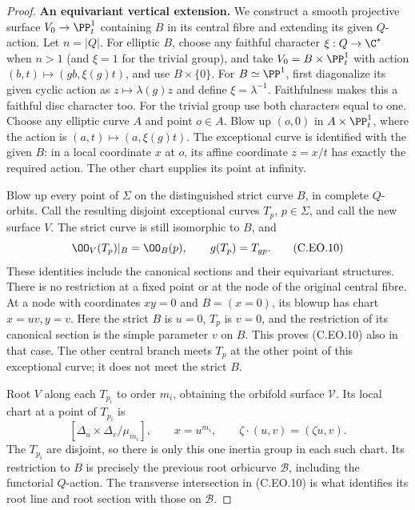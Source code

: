 \begin{proof}
\par\medskip\noindent\textbf{An equivariant vertical extension.}
We construct a smooth projective surface
$V_0\to\PP^1_t$ containing $B$ in its
central fibre and extending its given
$Q$-action. Let $n=|Q|$.
For elliptic $B$, choose any faithful
character $\xi:Q\to\C^*$ when $n>1$
(and $\xi=1$ for the trivial group),
and take $V_0=B\times\PP^1_t$
with action $(b,t)\mapsto(gb,\xi(g)t)$,
and use $B\times\{0\}$.
For $B\simeq\PP^1$, first diagonalize
its given cyclic action as
$z\mapsto\lambda(g)z$ and define
$\xi=\lambda^{-1}$. Faithfulness makes
this a faithful disc character too.
For the trivial group use both
characters equal to one. Choose any
elliptic curve $A$ and point $o\in A$.
Blow up $(o,0)$ in $A\times\PP^1_t$,
where the action is
$(a,t)\mapsto(a,\xi(g)t)$.
The exceptional curve is identified with
the given $B$: in a local coordinate $x$
at $o$, its affine coordinate $z=x/t$
has exactly the required action. The
other chart supplies its point at infinity.

Blow up every point of $\Sigma$ on the
distinguished strict curve $B$, in complete
$Q$-orbits. Call the resulting disjoint
exceptional curves $T_p$, $p\in\Sigma$,
and call the new surface $V$. The strict
curve is still isomorphic to $B$, and
\[
 \OO_V(T_p)|_B=\OO_B(p),\qquad
                     g(T_p)=T_{gp}.                \tag{C.EO.10}
\]
These identities include the canonical
sections and their equivariant structures.
There is no restriction at a fixed point
or at the node of the original central
fibre. At a node with coordinates $xy=0$
and $B=(x=0)$, its blowup has chart
$x=uv,y=v$. Here the strict $B$ is
$u=0$, $T_p$ is $v=0$, and the
restriction of its canonical section
is the simple parameter $v$ on $B$.
This proves (C.EO.10) also in that case.
The other central branch meets $T_p$
at the other point of this exceptional
curve; it does not meet the strict $B$.

Root $V$ along each $T_{p_i}$ to order
$m_i$, obtaining the orbifold surface
$\mathcal V$. Its local chart at a
point of $T_{p_i}$ is
\[
 [\Delta_u\times\Delta_v/\mu_{m_i}],
           \qquad x=u^{m_i},\qquad
           \zeta\cdot(u,v)=(\zeta u,v).
                                                               \tag{C.EO.11}
\]
The $T_{p_i}$ are disjoint, so there
is only this one inertia group in
each such chart. Its restriction to
$B$ is precisely the previous root
orbicurve $\mathcal B$, including the
functorial $Q$-action. The transverse
intersection in (C.EO.10) is what
identifies its root line and root
section with those on $\mathcal B$.


\end{proof}
